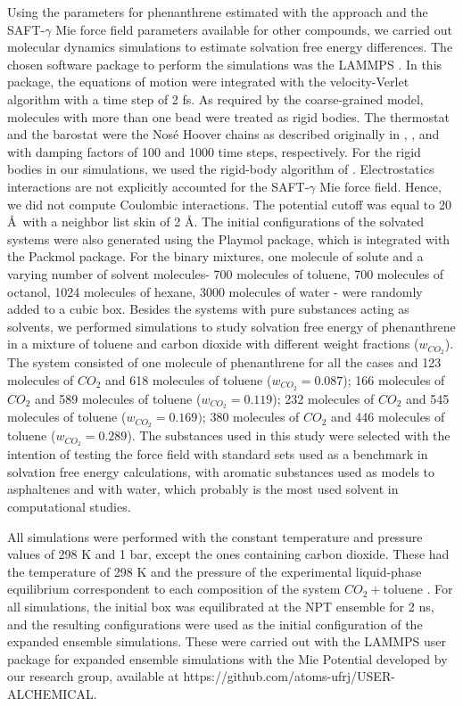 Using the parameters for phenanthrene estimated with the  approach and the SAFT-$\gamma$ Mie force field parameters available for other compounds, we carried out molecular dynamics simulations to estimate solvation free energy differences. The chosen software package to perform the simulations was the LAMMPS  \cite{lammps}. In this package, the equations of motion were integrated with the velocity-Verlet algorithm \cite{verlet} with a time step of 2 fs. As required by the coarse-grained model,  molecules with more than one bead were treated as rigid bodies. The thermostat and the barostat were the Nos\'{e} Hoover chains as described originally in , , and  with damping factors of 100 and 1000 time steps, respectively. For the rigid bodies in our simulations, we used the rigid-body algorithm of . Electrostatics interactions are not explicitly accounted for the SAFT-$\gamma$ Mie force field. Hence, we did not compute Coulombic interactions. The potential cutoff was equal to 20 \AA $\,$ \cite{muller2017} with a neighbor list skin of 2 \AA. The initial configurations of the solvated systems were also generated using the Playmol package, which is integrated with the Packmol package. For the binary mixtures, one molecule of solute and a varying number of solvent molecules- 700 molecules of toluene, 700 molecules of octanol, 1024 molecules of hexane, 3000 molecules of water - were randomly added to a cubic box. Besides the systems with pure substances acting as solvents, we performed simulations to study solvation free energy of phenanthrene in a mixture of toluene and carbon dioxide with different weight fractions ($w_{CO_{2}}$). The  system consisted of one molecule of phenanthrene for all the cases and 123 molecules of $CO_{2}$ and 618 molecules of toluene ($w_{CO_{2}} = 0.087$); 166 molecules of $CO_{2}$ and 589 molecules of toluene ($w_{CO_{2}} = 0.119$); 232 molecules of $CO_{2}$ and 545 molecules of toluene ($w_{CO_{2}} = 0.169)$; 380 molecules of $CO_{2}$ and 446 molecules of toluene ($w_{CO_{2}} = 0.289$). The substances used in this study were selected with the intention of testing the force field with standard sets used as a benchmark in solvation free energy calculations, with aromatic substances used as models to asphaltenes and with water, which probably is the most used solvent in computational studies.

All simulations were performed with the constant temperature and pressure values of 298 K and 1 bar, except the ones containing carbon dioxide. These had the temperature of 298 K and the pressure of the experimental liquid-phase equilibrium correspondent to each composition of the system $CO_{2}+$toluene \cite{co2toliq}. For all simulations, the initial box was equilibrated at the NPT ensemble for 2 ns, and the resulting configurations were used as the initial configuration of the expanded ensemble simulations. These were carried out with the LAMMPS user package for expanded ensemble simulations with the Mie Potential developed by our research group, available at https://github.com/atoms-ufrj/USER-ALCHEMICAL. 

